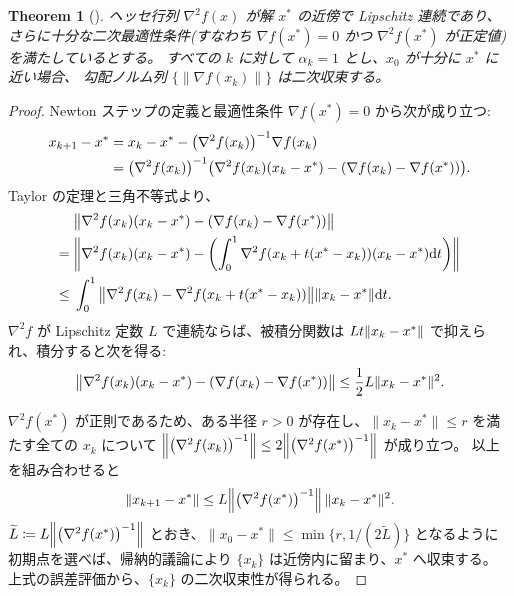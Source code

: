 \documentclass[a4paper, 10pt, dvipdfmx,draft]{article}
\newcommand{\defeq}{\coloneqq}
\newtheorem{theorem}{Theorem}
\begin{document}
\begin{theorem}[{\cite[Thm.~3.5]{nocedal1999numerical}}]
    \label{thm:newton-quadratic}
    ヘッセ行列 $\nabla^2 f(x)$ が解 $x^*$ の近傍で Lipschitz 連続であり、さらに十分な二次最適性条件(すなわち $\nabla f(x^*)=0$ かつ $\nabla^2 f(x^*)$ が正定値) を満たしているとする。
    すべての $k$ に対して $\alpha_k=1$ とし、$x_0$ が十分に $x^*$ に近い場合、
    勾配ノルム列 $\{\|\nabla f(x_k)\|\}$ は二次収束する。
\end{theorem}
\begin{proof}
    Newton ステップの定義と最適性条件 $\nabla f(x^*)=0$ から次が成り立つ:
    \begin{align*}
        x_{k+1} - x^*
         & = x_k - x^* - \qty(\nabla^2 f(x_k))^{-1}\nabla f(x_k)                                          \\
         & = \qty(\nabla^2 f(x_k))^{-1} \qty(\nabla^2 f(x_k)(x_k-x^*)-\qty(\nabla f(x_k)-\nabla f(x^*))).
    \end{align*}
    Taylor の定理と三角不等式より、
    \begin{align*}
                & \norm{\nabla^2 f(x_k)(x_k-x^*)-\qty(\nabla f(x_k)-\nabla f(x^*))}                          \\
        =   {}  & \norm{\nabla^2 f(x_k)(x_k-x^*)-\qty(\int_0^1 \nabla^2 f(x_k+t(x^*-x_k)) (x_k - x^*)\dd t)} \\
        \leq {} & \int_0^1 \norm{\nabla^2 f(x_k)-\nabla^2 f(x_k+t(x^*-x_k))}\norm{x_k-x^*}\dd t.
    \end{align*}
    $\nabla^2 f$ が Lipschitz 定数 $L$ で連続ならば、被積分関数は $Lt\norm{x_k-x^*}$ で抑えられ、積分すると次を得る:
    \begin{equation*}
        \norm{\nabla^2 f(x_k)(x_k-x^*)-\qty(\nabla f(x_k)-\nabla f(x^*))}
        \le \frac{1}{2}L\|x_k-x^*\|^2.
    \end{equation*}

    $\nabla^2 f(x^*)$ が正則であるため、ある半径 $r>0$ が存在し、$\|x_k-x^*\|\le r$ を満たす全ての $x_k$ について
    $\norm{\qty(\nabla^2 f(x_k))^{-1}}\le 2\norm{\qty(\nabla^2 f(x^*))^{-1}}$ が成り立つ。
    以上を組み合わせると
    \begin{equation*}
        \|x_{k+1} - x^*\|
        \le L\norm{\qty(\nabla^2 f(x^*))^{-1}} \,\|x_k-x^*\|^2.
    \end{equation*}
    $\widetilde L  \defeq  L\norm{\qty(\nabla^2 f(x^*))^{-1}}$ とおき、$\|x_0-x^*\|\le \min\{r,1/(2\widetilde L)\}$ となるように初期点を選べば、帰納的議論により $\{x_k\}$ は近傍内に留まり、$x^*$ へ収束する。
    上式の誤差評価から、$\{x_k\}$ の二次収束性が得られる。


\end{proof}
\end{document}
